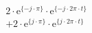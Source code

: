 \begin{align*}
&  2 \cdot \textrm{e}^{\{-j \cdot \pi \}} \cdot \textrm{e}^{\{-j \cdot 2\pi \cdot t \}} \\
&+ 2 \cdot \textrm{e}^{\{ j \cdot \pi \}} \cdot \textrm{e}^{\{ j \cdot 2\pi \cdot t \}}
\end{align*}
